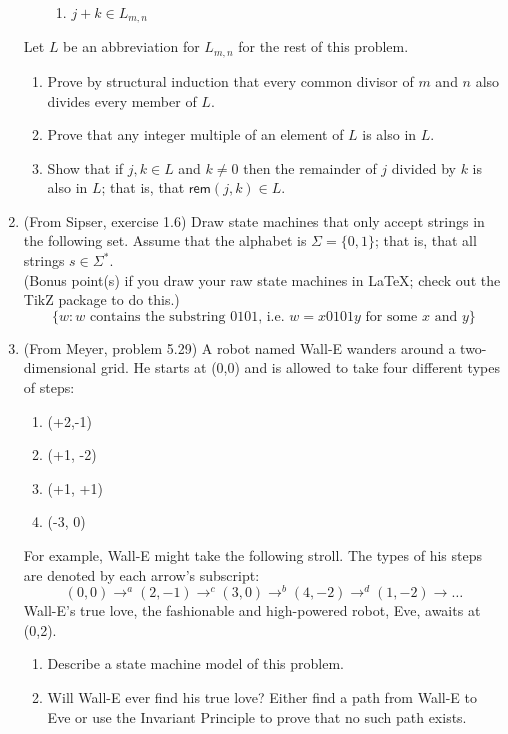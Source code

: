 \documentclass[12pt]{article}
\begin{document}
\begin{enumerate}
\begin{itemize}
\begin{enumerate}
\item $j + k \in L_{m,n}$
\end{enumerate}
\end{itemize}
Let $L$ be an abbreviation for $L_{m,n}$ for the rest of this problem.
\begin{enumerate}
\item Prove by structural induction that every common divisor of $m$ and $n$ also divides every member of $L$.
\item Prove that any integer multiple of an element of $L$ is also in $L$.
\item Show that if $j,k \in L$ and $k \not = 0$ then the remainder of $j$ divided by $k$ is also in $L$; that is, that  $\mathsf{rem}(j,k) \in L$.
\end{enumerate}
\item (From Sipser, exercise 1.6) Draw state machines that only accept strings in the following set. Assume that the alphabet is $\Sigma = \{0,1\}$; that is, that all strings $s \in \Sigma^*$.\\ (Bonus point(s) if you draw your raw state machines in LaTeX; check out the TikZ package to do this.)
$$\{w:w \text{ contains the substring 0101, i.e. }w = x0101y \text{ for some }x \text{ and }y\}$$
\item (From Meyer, problem 5.29) A robot named Wall-E wanders around a two-dimensional grid. He starts at (0,0) and is allowed to take four different types of steps:
\begin{enumerate}
\item (+2,-1)
\item (+1, -2)
\item (+1, +1)
\item (-3, 0)
\end{enumerate}
For example, Wall-E might take the following stroll. The types of his steps are denoted by each arrow's subscript:
$$(0,0) \to^a (2,-1) \to^c (3,0) \to^b (4,-2) \to^d (1,-2) \to \ldots$$
Wall-E's true love, the fashionable and high-powered robot, Eve, awaits at (0,2).
\begin{enumerate}
\item Describe a state machine model of this problem.
\item Will Wall-E ever find his true love? Either find a path from Wall-E to Eve or use the Invariant Principle to prove that no such path exists.
\end{enumerate}
\end{enumerate}
\end{document}
